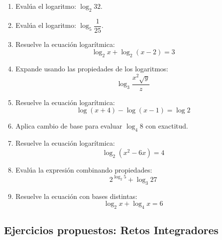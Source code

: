 \documentclass[12pt, letterpaper]{article}
\begin{document}
\begin{enumerate}[resume=ejercicios, leftmargin=*]
  \item \facil{} Evalúa el logaritmo: $\log_2 32$.

  \item \facil{} Evalúa el logaritmo: $\log_5 \dfrac{1}{25}$.

  \item \medio{} Resuelve la ecuación logarítmica:
        $$\log_2 x + \log_2 (x - 2) = 3$$

  \item \medio{} Expande usando las propiedades de los logaritmos:
        $$\log_3 \frac{x^2 \sqrt{y}}{z}$$

  \item \medio{} Resuelve la ecuación logarítmica:
        $$\log(x + 4) - \log(x - 1) = \log 2$$

  \item \dificil{} Aplica cambio de base para evaluar $\log_4 8$ con exactitud.

  \item \dificil{} Resuelve la ecuación logarítmica:
        $$\log_2 (x^2 - 6x) = 4$$

  \item \dificil{} Evalúa la expresión combinando propiedades:
        $$2^{\log_2 5} + \log_3 27$$

  \item \muyDificil{} Resuelve la ecuación con bases distintas:
        $$\log_2 x + \log_4 x = 6$$
\end{enumerate}

\subsection{Ejercicios propuestos: Retos Integradores}
\end{document}
